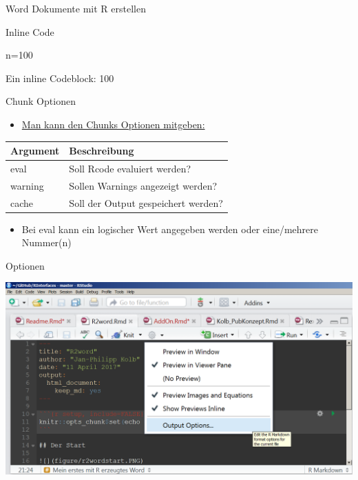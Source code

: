 \documentclass[ignorenonframetext,]{beamer}
\newenvironment{Shaded}{}{}
\newcommand{\DecValTok}[1]{\textcolor[rgb]{0.25,0.63,0.44}{{#1}}}
\newcommand{\NormalTok}[1]{{#1}}
\providecommand{\tightlist}{%
\setlength{\itemsep}{0pt}\setlength{\parskip}{0pt}}
\begin{document}
\begin{frame}[fragile]{Word Dokumente mit R erstellen}
\begin{block}{Inline Code}
\begin{Shaded}
\begin{Highlighting}[]
\NormalTok{n=}\DecValTok{100}
\end{Highlighting}
\end{Shaded}

Ein inline Codeblock: 100

\end{block}

\begin{block}{Chunk Optionen}

\begin{itemize}
\tightlist
\item
  \href{https://yihui.name/knitr/options/}{Man kann den Chunks Optionen
  mitgeben:}
\end{itemize}

\begin{longtable}[]{@{}ll@{}}
\toprule
Argument & Beschreibung\tabularnewline
\midrule
\endhead
eval & Soll Rcode evaluiert werden?\tabularnewline
warning & Sollen Warnings angezeigt werden?\tabularnewline
cache & Soll der Output gespeichert werden?\tabularnewline
\bottomrule
\end{longtable}

\begin{itemize}
\tightlist
\item
  Bei eval kann ein logischer Wert angegeben werden oder eine/mehrere
  Nummer(n)
\end{itemize}

\end{block}

\begin{block}{Optionen}

\includegraphics{./tex2pdf.9796/c21462827b02e887fc8f91cd0cdb51e5b48be417.png}

\end{block}


\end{frame}
\end{document}
